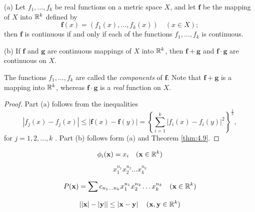 \begin{thm}
    \label{thm:4.10}
    (a) Let $f_1, \dots , f_k$ be real functions on a metric space $X$, and let $\mathbf{f}$ be the mapping of $X$ into ${\protect\mathbb R}^{k}$ defined by
    \begin{equation}
        \label{eq:4.7}
        \mathbf{f}(x) = (f_1(x), ... ,f_k(x)) \quad    (x \in  X);
    \end{equation}
    then $\mathbf{f}$ is continuous if and only if each of the functions $f_1, ... , f_k$ is continuous.

    (b) If $\mathbf{f}$ and $\mathbf{g}$ are continuous mappings of $X$ into ${\protect\mathbb R}^{k}$, 
    then $\mathbf{f + g}$ and $\mathbf{f \cdot g}$ are continuous on $X$.
\end{thm}
The functions $f_1, ... , f_k$ are called the \emph{components} of $\mathbf{f}$. 
Note that $\mathbf{f + g}$ is a mapping into ${\protect\mathbb R}^{k}$, whereas $\mathbf{f \cdot g}$ is a \emph{real} function on $X$.
\begin{proof}
    Part (a) follows from the inequalities
    \begin{equation*}
        \left| f_j(x) -f_j(x) \right| \leq
        \left| \mathbf{f}(x) - \mathbf{f}(y) \right| =
        \left\{
            \sum_{i=1}^{k} \left| f_i(x) - f_i(y) \right|^2
        \right\}^{\frac{1}{2}},
    \end{equation*}
    for $j=1,2,...,k$ . Part (b) follows form (a) and Theorem \ref{thm:4.9}.
\end{proof}

\begin{myExample}
    \label{myExample:4.11}
    \begin{equation}
        \phi_i (\mathbf{x}) = x_i 
        \quad (\mathbf{x} \in {\protect\mathbb R}^{k})
    \end{equation}

    \begin{equation}
        x_{1}^{n_1}
        x_{2}^{n_2}
        \dots
        x_{k}^{n_k}
    \end{equation}

    \begin{equation}
        P(\mathbf{x}) = \sum c_{n_1 \dots n_k} 
        x_{1}^{n_1}
        x_{2}^{n_2}
        \dots
        x_{k}^{n_k}
        \quad (\mathbf{x} \in {\protect\mathbb R}^{k})
    \end{equation}

    \begin{equation}
        \left| 
            \left| \mathbf{x} \right| -
            \left| \mathbf{y} \right|  
        \right| \leq
        \left| \mathbf{x-y} \right| 
        \quad (\mathbf{x,y} \in {\protect\mathbb R}^{k})
    \end{equation}
\end{myExample}

